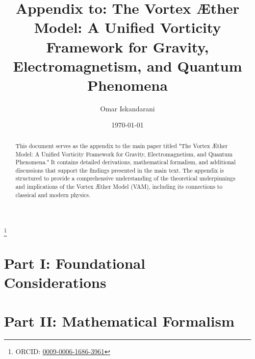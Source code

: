 \documentclass{book}          %
\let\oldtoc\tableofcontents
\renewcommand{\tableofcontents}{
  \begingroup
  \setstretch{1.0}
  \oldtoc
  \endgroup
}
\begin{document}
\author{Omar Iskandarani}
    \title{Appendix to: The Vortex Æther Model: A Unified Vorticity Framework for Gravity, Electromagnetism, and Quantum Phenomena}
    \date{\today}
    \thanks{ORCID: \href{https://orcid.org/0009-0006-1686-3961}{0009-0006-1686-3961}}

    \begin{abstract}
        This document serves as the appendix to the main paper titled "The Vortex Æther Model: A Unified Vorticity Framework for Gravity, Electromagnetism, and Quantum Phenomena." It contains detailed derivations, mathematical formalism, and additional discussions that support the findings presented in the main text. The appendix is structured to provide a comprehensive understanding of the theoretical underpinnings and implications of the Vortex Æther Model (VAM), including its connections to classical and modern physics.
    \end{abstract}

    \maketitle
    \tableofcontents
    \newpage \label{appendix:11}
    

    \newpage \section*{Part I: Foundational Considerations}\label{sec:Part-1} 
    \newpage 
    \newpage 

    \newpage \section*{Part II: Mathematical Formalism}\label{sec:Part-2} 
    \newpage 
    \newpage 
    \newpage 
    \newpage 
    \newpage 
    \newpage 
    \newpage 
    \newpage 
    \newpage 
    \newpage 


    \newpage \label{appendix:10}


    
    
\end{document}
